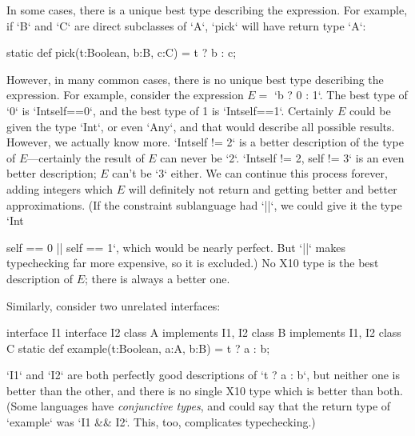 {In some cases, there is a unique best type describing the expression.  For
example, if \xcd`B` and \xcd`C` are direct subclasses of \xcd`A`, \xcd`pick`
will have return type \xcd`A`: 
\begin{xten}
static def pick(t:Boolean, b:B, c:C) = t ? b : c;  
\end{xten}

However, in many common cases, there is no unique best type describing the
expression.  For example, consider the expression {$E=$} \xcd`b ? 0 : 1`.  The
best type of \xcd`0` 
is \xcd`Int{self==0}`, and the best type of 1 is \xcd`Int{self==1}`.
Certainly {$E$} could be given the type \xcd`Int`, or even \xcd`Any`, and that
would describe all possible results.  However, we actually know more.
\xcd`Int{self != 2}` is a better description of the type of {$E$}---certainly
the result of {$E$} can never be \xcd`2`.   \xcd`Int{self != 2, self != 3}` is
an even better description; {$E$} can't be \xcd`3` either.  We can continue
this process forever, adding integers which {$E$} will definitely not return
and getting better and better approximations. (If the constraint
sublanguage had \xcd`||`, we could give it the type 
\xcd`Int{self == 0 || self == 1`, which would be nearly perfect.  But 
\xcd`||` makes typechecking far more expensive, so it is excluded.)
No X10 type is the best description of {$E$}; there is always a better one.

Similarly, consider two unrelated interfaces: 
\begin{xten}
interface I1 {}
interface I2 {}
class A implements I1, I2 {}
class B implements I1, I2 {}
class C {
  static def example(t:Boolean, a:A, b:B) = t ? a : b;
}
\end{xten}
%
\xcd`I1` and \xcd`I2` are both perfectly good descriptions of \xcd`t ? a : b`, 
but neither one is better than the other, and there is no single X10 type
which is better than both. (Some languages have {\em conjunctive
    types}, and could say that the return type of \xcd`example` was 
\xcd`I1 && I2`.  This, too, complicates typechecking.)
}

}

